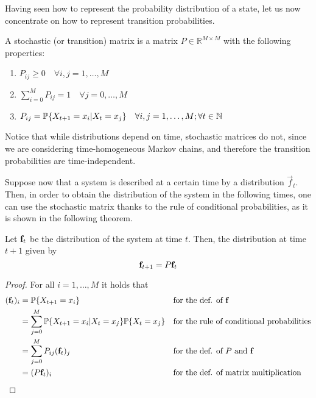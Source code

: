 \smallskip
Having seen how to represent the probability distribution of a state, let us now concentrate on how to represent transition probabilities.

\begin{ndef}  \label{def:stoc_matrix}
    A stochastic (or transition) matrix is a matrix $P \in \mathbb{R}^{M\times M}$ with the following properties:
    \begin{center}
        \begin{enumerate}
            \item $P_{ij} \geq 0 \quad \forall i,j = 1,\dots,M$
            \item $\sum_{i = 0}^M P_{ij} = 1 \quad \forall j = 0,\dots,M$
            \item $P_{ij} = \mathbb{P}\{X_{t+1} = x_i | X_t = x_j \} \quad \forall i,j = 1,\dots,M; \forall t\in \mathbb N$
        \end{enumerate}
    \end{center}
\end{ndef}

Notice that while distributions depend on time, stochastic matrices do not, since we are considering time-homogeneous Markov chains, and therefore the transition probabilities are time-independent.

\smallskip
Suppose now that a system is described at a certain time by a distribution $\vec{f}_t$. Then, in order to obtain the distribution of the system in the following times, one can use the stochastic matrix thanks to the rule of conditional probabilities, as it is shown in the following theorem.

\begin{theorem} \label{th:evolution_simple}
    Let $\mathbf{f}_t$ be the distribution of the system at time $t$. Then, the distribution at time $t + 1$ given by
    \begin{equation}
        \mathbf{f}_{t+1} = P \mathbf{f}_t
    \end{equation}
\end{theorem}
\begin{proof}
    For all $i = 1,\dots,M$ it holds that
    \begin{align}
        (\mathbf{f}_t)_i
         & = \mathbb{P}\{X_{t+1} = x_i \}                                           &  & \text{for the def. of $\mathbf{f}$}                                     \\
         & = \sum_{j = 0}^M \mathbb{P}\{X_{t+1} = x_i | X_t = x_j\} \mathbb{P}\{X_t = x_j\} &  & \text{for the rule of conditional probabilities}                \\
         & = \sum_{j = 0}^M P_{ij} (\mathbf{f}_t)_j                                   &  & \text{for the def. of $P$ and $\mathbf{f}$} \label{eq:matmul1}          \\
         & = (P \mathbf{f}_t)_i                                                       &  & \text{for the def. of matrix multiplication} \label{eq:matmul2}
    \end{align}

\end{proof}


